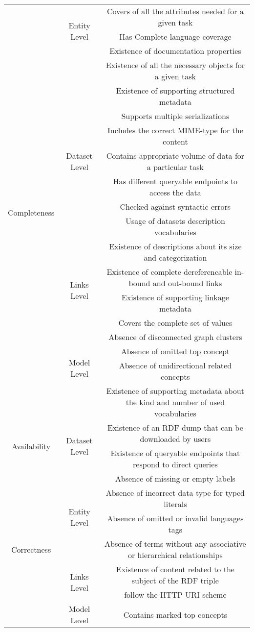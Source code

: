 \documentclass[onecolumn, crcready]{iosart2c}
\begin{document}
\begin{landscape}
\begin{center}
\begin{longtable}[h]{|c|c|c|}
\hline 
\multirow{19}{*}{Completeness} & \multirow{3}{*}{Entity Level} & Covers of all the attributes needed for a given task\tabularnewline
\cline{3-3} 
 &  & Has Complete language coverage \tabularnewline
\cline{3-3} 
 &  & Existence of documentation properties \tabularnewline
\cline{2-3} 
 & \multirow{9}{*}{Dataset Level} & Existence of all the necessary objects for a given task \tabularnewline
\cline{3-3} 
 &  & Existence of supporting structured metadata \tabularnewline
\cline{3-3} 
 &  & Supports multiple serializations\tabularnewline
\cline{3-3} 
 &  & Includes the correct MIME-type for the content\tabularnewline
\cline{3-3} 
 &  & Contains appropriate volume of data for a particular task\tabularnewline
\cline{3-3} 
 &  & Has different queryable endpoints to access the data\tabularnewline
\cline{3-3} 
 &  & Checked against syntactic errors\tabularnewline
\cline{3-3} 
 &  & Usage of datasets description vocabularies \tabularnewline
\cline{3-3} 
 &  & Existence of descriptions about its size and categorization \tabularnewline
\cline{2-3} 
 & \multirow{2}{*}{Links Level} & Existence of complete dereferencable in-bound and out-bound links\tabularnewline
\cline{3-3} 
 &  & Existence of supporting linkage metadata\tabularnewline
\cline{2-3} 
 & \multirow{5}{*}{Model Level} & Covers the complete set of values\tabularnewline
\cline{3-3} 
 &  & Absence of disconnected graph clusters\tabularnewline
\cline{3-3} 
 &  & Absence of omitted top concept\tabularnewline
\cline{3-3} 
 &  & Absence of unidirectional related concepts\tabularnewline
\cline{3-3} 
 &  & Existence of supporting metadata about the kind and number of used vocabularies \tabularnewline
\hline 
\hline 
\multirow{2}{*}{Availability} & \multirow{2}{*}{Dataset Level} & Existence of an RDF dump that can be downloaded by users\tabularnewline
\cline{3-3} 
 &  & Existence of queryable endpoints that respond to direct queries\tabularnewline
\hline 
\hline 
\multirow{8}{*}{Correctness} & \multirow{4}{*}{Entity Level} & Absence of missing or empty labels\tabularnewline
\cline{3-3} 
 &  & Absence of incorrect data type for typed literals \tabularnewline
\cline{3-3} 
 &  & Absence of omitted or invalid languages tags \tabularnewline
\cline{3-3} 
 &  & Absence of terms without any associative or hierarchical relationships\tabularnewline
\cline{2-3} 
 & \multirow{2}{*}{Links Level} & Existence of content related to the subject of the RDF triple\tabularnewline
\cline{3-3} 
 &  & follow the HTTP URI scheme\tabularnewline
\cline{2-3} 
 & \multirow{2}{*}{Model Level} & Contains marked top concepts\tabularnewline

\end{longtable}
\end{center}
\end{landscape}
\end{document}
